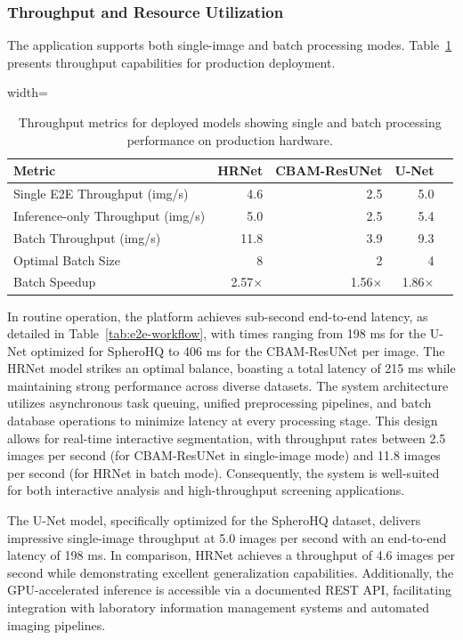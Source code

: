 \documentclass[preprint,12pt]{elsarticle}
\newcommand{\dsHQ}{SpheroHQ}
\begin{document}
\subsubsection{Throughput and Resource Utilization}

The application supports both single-image and batch processing modes. Table~\ref{tab:throughput-metrics} presents throughput capabilities for production deployment.

\begin{table}[!b]
\centering
\caption{Throughput metrics for deployed models showing single and batch processing performance on production hardware.}
\label{tab:throughput-metrics}
\begin{adjustbox}{width=\textwidth}
\begin{tabular}{@{}lrrrr@{}}
\toprule
\textbf{Metric} & \textbf{HRNet} & \textbf{CBAM-ResUNet} & \textbf{U-Net} \\
\midrule
Single E2E Throughput (img/s) & 4.6 & 2.5 & 5.0 \\
Inference-only Throughput (img/s) & 5.0 & 2.5 & 5.4 \\
Batch Throughput (img/s) & 11.8 & 3.9 & 9.3 \\
Optimal Batch Size & 8 & 2 & 4 \\
Batch Speedup & 2.57× & 1.56× & 1.86× \\
\bottomrule
\end{tabular}
\end{adjustbox}
\end{table}

In routine operation, the platform achieves sub-second end-to-end latency, as detailed in Table~\ref{tab:e2e-workflow}, with times ranging from 198 ms for the U-Net optimized for \dsHQ{} to 406 ms for the CBAM-ResUNet per image. The HRNet model strikes an optimal balance, boasting a total latency of 215 ms while maintaining strong performance across diverse datasets. The system architecture utilizes asynchronous task queuing, unified preprocessing pipelines, and batch database operations to minimize latency at every processing stage. This design allows for real-time interactive segmentation, with throughput rates between 2.5 images per second (for CBAM-ResUNet in single-image mode) and 11.8 images per second (for HRNet in batch mode). Consequently, the system is well-suited for both interactive analysis and high-throughput screening applications.

The U-Net model, specifically optimized for the \dsHQ{} dataset, delivers impressive single-image throughput at 5.0 images per second with an end-to-end latency of 198 ms. In comparison, HRNet achieves a throughput of 4.6 images per second while demonstrating excellent generalization capabilities. Additionally, the GPU-accelerated inference is accessible via a documented REST API, facilitating integration with laboratory information management systems and automated imaging pipelines.
\end{document}
